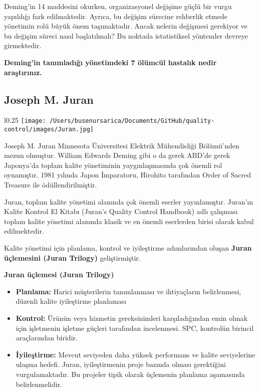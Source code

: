 \documentclass[
]{book}
\begin{document}
\vspace{0.3cm}

Deming'in 14 maddesini okurken, organizasyonel değişime güçlü bir vurgu yapıldığı fark edilmaktedir. Ayrıca, bu değişim sürecine rehberlik etmede yönetimin rolü büyük önem taşımaktadır. Ancak nelerin değişmesi gerekiyor ve bu değişim süreci nasıl başlatılmalı? Bu noktada istatistiksel yöntemler devreye girmektedir.

\textbf{Deming'in tanımladığı yönetimdeki 7 ölümcül hastalık nedir araştırınız.}

\pagebreak

\hypertarget{joseph-m.-juran}{%
\subsection{Joseph M. Juran}\label{joseph-m.-juran}}

\begin{wrapfigure}{l}{0.25\textwidth}
\texttt{[image: /Users/busenursarica/Documents/GitHub/quality-control/images/Juran.jpg]}
\end{wrapfigure}

Joseph M. Juran Minnesota Üniversitesi Elektrik Mühendisliği Bölümü'nden mezun olmuştur. William Edwards Deming gibi o da gerek ABD'de gerek Japonya'da toplam kalite yönetiminin yaygınlaşmasında çok önemli rol oynamıştır. 1981 yılında Japon İmparatoru, Hirohito tarafından Order of Sacred Treasure ile ödüllendirilmiştir.

Juran, toplam kalite yönetimi alanında çok önemli eserler yayınlamıştır. Juran'ın Kalite Kontrol El Kitabı (Juran's Quality Control Handbook) adlı çalışması toplam kalite yönetimi alanında klasik ve en önemli eserlerden birisi olarak kabul edilmektedir.

Kalite yönetimi için planlama, kontrol ve iyileştirme adımlarından oluşan \textbf{Juran üçlemesini (Juran Trilogy)} geliştirmiştir.

\textbf{Juran üçlemesi (Juran Trilogy)}

\begin{itemize}
\item
  \textbf{Planlama:} Harici müşterilerin tanımlanması ve ihtiyaçların belirlenmesi, düzenli kalite iyileştirme planlaması
\item
  \textbf{Kontrol:} Ürünün veya hizmetin gereksinimleri karşıladığından emin olmak için işletmenin işletme güçleri tarafından incelenmesi. SPC, kontrolün birincil araçlarından biridir.
\item
  \textbf{İyileştirme:} Mevcut seviyeden daha yüksek performans ve kalite seviyelerine ulaşma hedefi. Juran, iyileştirmenin proje bazında olması gerektiğini vurgulamaktadır. Bu projeler tipik olarak üçlemenin planlama aşamasında belirlenmelidir.
\end{itemize}
\end{document}
